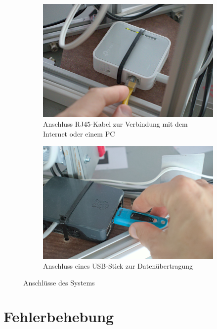 \documentclass[./00PhotoBox.tex]{subfiles}
\begin{document}
\begin{figure}
    \centering
    \begin{subfigure}{0.48\textwidth}
        \includegraphics[width=1\textwidth]{img/9_anleitung/rj45.jpg}
        \caption{Anschluss RJ45-Kabel zur Verbindung mit dem Internet oder einem PC}
        \label{img:rj45}
    \end{subfigure}
    \begin{subfigure}{0.48\textwidth}
        \includegraphics[width=1\textwidth]{img/9_anleitung/usbstick.jpg}
        \caption{Anschluss eines USB-Stick zur Datenübertragung}
        \label{img:usbstick}
    \end{subfigure}
    \caption{Anschlüsse des Systems}
\end{figure}

\section{Fehlerbehebung}
\label{sec:Fehlerbehebung}
\end{document}
